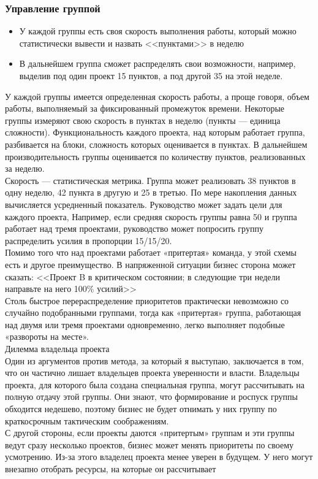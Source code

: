 \documentclass{../industrial-development}
\begin{document}
\begin{frame} \frametitle{Управление группой}
\begin{itemize}
  \item У каждой группы есть своя скорость выполнения работы, который можно статистически вывести и назвать <<пунктами>> в неделю
  \item В дальнейшем группа сможет распределять свои возможности, например, выделив под один проект 15 пунктов, а под другой 35 на этой неделе.
\end{itemize}
\end{frame}
\lecturenotes
У каждой группы имеется определенная скорость работы, а проще говоря, объем работы, выполняемый за фиксированный промежуток времени. Некоторые группы измеряют свою скорость в пунктах в неделю
(пункты — единица сложности). Функциональность каждого проекта, над которым работает группа, разбивается на блоки, сложность которых оценивается в пунктах. В дальнейшем производительность группы оценивается по количеству пунктов, реализованных за неделю.\\
Скорость — статистическая метрика. Группа может реализовать 38 пунктов в одну неделю, 42 пункта в другую и 25 в третью. По мере накопления данных вычисляется усредненный показатель. Руководство может задать цели для каждого проекта, Например, если средняя скорость группы равна 50 и группа работает над тремя проектами, руководство может попросить группу распределить усилия
в пропорции 15/15/20.\\
Помимо того что над проектами работает «притертая» команда, у этой схемы есть и другое преимущество. В напряженной ситуации бизнес сторона может сказать: <<Проект B в критическом состоянии; в следующие три недели направьте на него 100\% усилий>>\\
Столь быстрое перераспределение приоритетов практически невозможно со случайно подобранными группами, тогда как «притертая» группа, работающая над двумя или тремя проектами одновременно, легко выполняет подобные «развороты на месте».\\
Дилемма владельца проекта\\
Один из аргументов против метода, за который я выступаю, заключается в том, что он частично лишает владельцев проекта уверенности и власти. Владельцы проекта, для которого была создана специальная группа, могут рассчитывать на полную отдачу этой группы. Они знают, что формирование и роспуск группы обходится недешево, поэтому бизнес не будет отнимать у них группу по краткосрочным тактическим соображениям.\\
С другой стороны, если проекты даются «притертым» группам и эти группы ведут сразу несколько проектов, бизнес может менять приоритеты по своему усмотрению. Из-за этого владелец проекта менее уверен в будущем. У него могут внезапно отобрать ресурсы, на которые он рассчитывает
\end{document}
